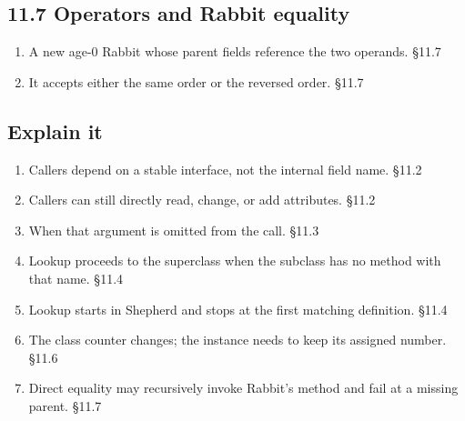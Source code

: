 \documentclass[11pt]{article}
\begin{document}
\begin{keepsection}\subsection{11.7 Operators and Rabbit equality}

\begin{enumerate}
\item A new age-0 Rabbit whose parent fields reference the two operands. \hfill{\small\color{FAUblue}§11.7}
\item It accepts either the same order or the reversed order. \hfill{\small\color{FAUblue}§11.7}
\end{enumerate}

\end{keepsection}
\begin{keepsection}\subsection{Explain it}

\begin{enumerate}
\item Callers depend on a stable interface, not the internal field name. \hfill{\small\color{FAUblue}§11.2}
\item Callers can still directly read, change, or add attributes. \hfill{\small\color{FAUblue}§11.2}
\item When that argument is omitted from the call. \hfill{\small\color{FAUblue}§11.3}
\item Lookup proceeds to the superclass when the subclass has no method with that name. \hfill{\small\color{FAUblue}§11.4}
\item Lookup starts in Shepherd and stops at the first matching definition. \hfill{\small\color{FAUblue}§11.4}
\item The class counter changes; the instance needs to keep its assigned number. \hfill{\small\color{FAUblue}§11.6}
\item Direct equality may recursively invoke Rabbit’s method and fail at a missing parent. \hfill{\small\color{FAUblue}§11.7}
\end{enumerate}

\end{keepsection}
\end{document}
